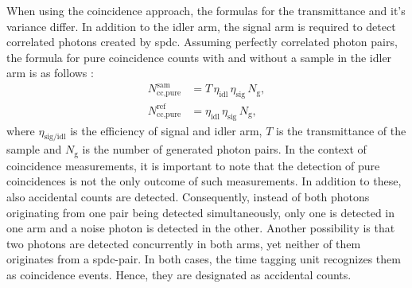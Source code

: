 When using the coincidence approach, the formulas for the transmittance and it's variance differ. In addition to the idler arm, the signal arm is required to detect correlated photons created by \acrshort{spdc}. Assuming perfectly correlated photon pairs, the formula for pure coincidence counts with and without a sample in the idler arm is as follows \cite{hayatTheoryPhotonCoincidence1999}:
\begin{equation}
	\begin{aligned}
		N_{\text{cc,pure}}^{\text{sam}} &= T \,\eta_{\text{idl}} \,\eta_{\text{sig}} \, N_{\mathrm{g}}, \\[0.5em]
		N_{\text{cc,pure}}^{\text{ref}} &= \eta_{\text{idl}} \,\eta_{\text{sig}} \, N_{\mathrm{g}},
	\end{aligned}
	\label{eq:pureCoinc}
\end{equation}
where $\eta_{\text{sig/idl}}$ is the efficiency of signal and idler arm, $T$ is the transmittance of the sample and $N_{\mathrm{g}}$ is the number of generated photon pairs. \newline
In the context of coincidence measurements, it is important to note that the detection of pure coincidences is not the only outcome of such measurements. In addition to these, also accidental counts are detected. Consequently, instead of both photons originating from one pair being detected simultaneously, only one is detected in one arm and a noise photon is detected in the other. Another possibility is that two photons are detected concurrently in both arms, yet neither of them originates from a \acrshort{spdc}-pair. In both cases, the time tagging unit recognizes them as coincidence events. Hence, they are designated as accidental counts. \newline
